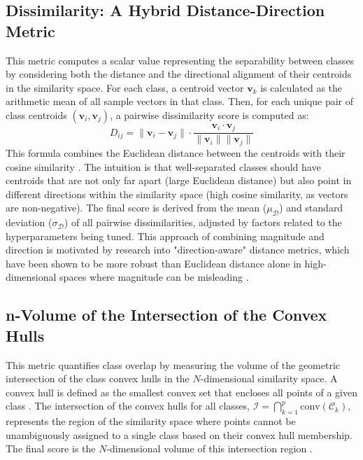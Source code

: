 \documentclass[conference]{IEEEtran}
\begin{document}
\subsection{Dissimilarity: A Hybrid Distance-Direction Metric}
This metric computes a scalar value representing the separability between classes by considering both the distance and the directional alignment of their centroids in the similarity space. For each class, a centroid vector $\mathbf{v}_k$ is calculated as the arithmetic mean of all sample vectors in that class. Then, for each unique pair of class centroids $(\mathbf{v}_i, \mathbf{v}_j)$, a pairwise dissimilarity score is computed as:
\begin{equation}
D_{ij} = \|\mathbf{v}_i - \mathbf{v}_j\| \cdot \frac{\mathbf{v}_i \cdot \mathbf{v}_j}{\|\mathbf{v}_i\| \|\mathbf{v}_j\|}
\end{equation}
This formula combines the Euclidean distance between the centroids with their cosine similarity \cite{b20}. The intuition is that well-separated classes should have centroids that are not only far apart (large Euclidean distance) but also point in different directions within the similarity space (high cosine similarity, as vectors are non-negative). The final score is derived from the mean ($\mu_{\mathcal{D}}$) and standard deviation ($\sigma_{\mathcal{D}}$) of all pairwise dissimilarities, adjusted by factors related to the hyperparameters being tuned. This approach of combining magnitude and direction is motivated by research into "direction-aware" distance metrics, which have been shown to be more robust than Euclidean distance alone in high-dimensional spaces where magnitude can be misleading \cite{b23, b24, b25}.

\subsection{n-Volume of the Intersection of the Convex Hulls}
This metric quantifies class overlap by measuring the volume of the geometric intersection of the class convex hulls in the $N$-dimensional similarity space. A convex hull is defined as the smallest convex set that encloses all points of a given class \cite{b26}. The intersection of the convex hulls for all classes, $\mathcal{I} = \bigcap_{k=1}^{p} \text{conv}(\mathcal{C}_k)$, represents the region of the similarity space where points cannot be unambiguously assigned to a single class based on their convex hull membership. The final score is the $N$-dimensional volume of this intersection region \cite{b20}.
\end{document}
